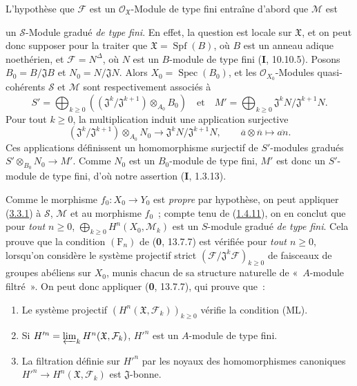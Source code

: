L'hypothèse que $\mathcal F$ est un $\mathcal O_{\mathfrak X}$-Module de type
fini entraîne d'abord que $\mathcal M$ est

un $\mathcal S$-Module gradué \emph{de type fini}. En effet, la question est
locale sur $\mathfrak X$, et on peut donc supposer pour la traiter que
$\mathfrak X=\operatorname{Spf}(B)$, où $B$ est un anneau adique noethérien,
et $\mathcal F=N^\Delta$, où $N$ est un $B$-module de type fini
(\textbf{I}, 10.10.5). Posons $B_0=B/\mathfrak J B$ et $N_0=N/\mathfrak JN$.
Alors $X_0=\operatorname{Spec}(B_0)$, et les
$\mathcal O_{X_0}$-Modules quasi-cohérents $\mathcal S$ et $\mathcal M$
sont respectivement associés à
\[
S'=\bigoplus_{k\geq0}
((\mathfrak J^k/\mathfrak J^{k+1})\otimes_{A_0}B_0)\quad\text{et}\quad
M'=\bigoplus_{k\geq0}\mathfrak J^kN/\mathfrak J^{k+1}N.
\]
Pour tout $k\geq0$, la multiplication induit une application surjective
\[
(\mathfrak J^k/\mathfrak J^{k+1})\otimes_{A_0}N_0
\longrightarrow\mathfrak J^kN/\mathfrak J^{k+1}N,
\qquad \overline a\otimes\overline n\longmapsto\overline{an}.
\]
Ces applications définissent un homomorphisme surjectif de
$S'$-modules gradués $S'\otimes_{B_0}N_0\longrightarrow M'$.
Comme $N_0$ est un $B_0$-module de type fini, $M'$ est donc un
$S'$-module de type fini, d'où notre assertion (\textbf{I}, 1.3.13).

Comme le morphisme $f_0:X_0\to Y_0$ est \emph{propre} par hypothèse, on peut
appliquer (\hyperref[III.3.3.1-fr]{3.3.1}) à $\mathcal S$, $\mathcal M$ et au
morphisme $f_0$~; compte tenu de (\hyperref[III.1.4.11-fr]{1.4.11}), on en
conclut que pour \emph{tout $n\geq0$},
$\bigoplus_{k\geq0}H^n(X_0,\mathcal M_k)$ est un $S$-module gradué \emph{de
type fini}. Cela prouve que la condition $(\mathrm F_n)$ de (\textbf{0}, 13.7.7) est
vérifiée pour \emph{tout $n\geq0$}, lorsqu'on considère le système projectif
strict $(\mathcal F/\mathfrak J^k\mathcal F)_{k\geq0}$ de faisceaux de
groupes abéliens sur $X_0$, munis chacun de sa structure naturelle de
«~$A$-module filtré~». On peut donc appliquer (\textbf{0}, 13.7.7), qui prouve que~:
\begin{enumerate}
\item[$1^\circ$] Le système projectif
$(H^n(\mathfrak X,\mathcal F_k))_{k\geq0}$ vérifie la condition (ML).
\item[$2^\circ$] Si
$H'^{n}=\varprojlim_kH^n(\mathfrak X,\mathcal F_k)$, $H'^{n}$ est un
$A$-module de type fini.
\item[$3^\circ$] La filtration définie sur $H'^{n}$ par les noyaux des
homomorphismes canoniques $H'^{n}\to H^n(\mathfrak X,\mathcal F_k)$ est
$\mathfrak J$-bonne.
\end{enumerate}

